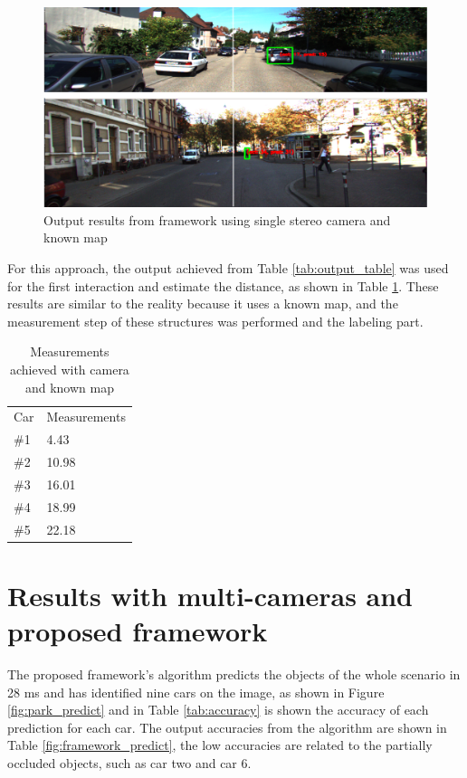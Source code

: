 \begin{figure}[H]
\centering
\includegraphics[width=\textwidth]{imagens/ouput.png}
\caption{Output results from framework using single stereo camera and known map}
\label{fig:output}
\end{figure}

For this approach, the output achieved from Table \ref{tab:output_table} was used for the first interaction and estimate the distance, as shown in Table \ref{tab:output_2}. These results are similar to the reality because it uses a known map, and the measurement step of these structures was performed and the labeling part.

\begin{table}[H]
\centering
\caption{Measurements achieved with camera and known map}
\begin{tabular}{l|l} 
\toprule
Car &  Measurements      \\
\#1   & 4.43        \\
\#2   & 10.98       \\
\#3   & 16.01       \\
\#4   & 18.99       \\
\#5   & 22.18       \\
\bottomrule
\end{tabular}
\label{tab:output_2}
\end{table} 


\section{Results with multi-cameras and proposed framework}


The proposed framework's algorithm predicts the objects of the whole scenario in 28 ms and has identified nine cars on the image, as shown in Figure \ref{fig:park_predict} and in Table \ref{tab:accuracy} is shown the accuracy of each prediction for each car. The output accuracies from the algorithm are shown in Table \ref{fig:framework_predict}, the low accuracies are related to the partially occluded objects, such as car two and car 6. 

